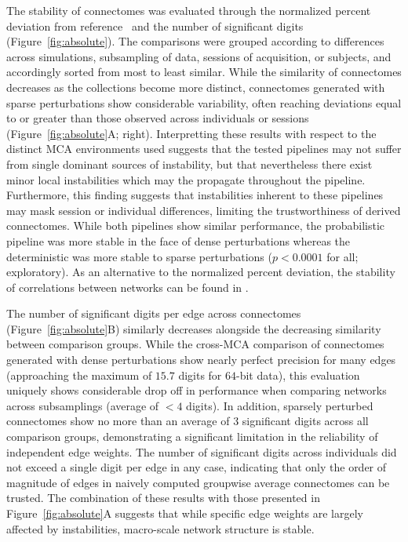 \documentclass[fleqn,10pt]{SelfArx} %
\newcommand{\new}[1]{{\color{blue} #1}}
\begin{document}
The stability of connectomes was evaluated through the \new{normalized percent} deviation from reference~\cite{Kiar2020-lb} and the number
of significant digits
(Figure~\ref{fig:absolute}). The comparisons were grouped according to differences across simulations, subsampling
of data, sessions of acquisition, or subjects, \new{and accordingly sorted from most to least similar}. While the
similarity of connectomes decreases as the collections become
more distinct, connectomes generated with \new{sparse} perturbations show considerable variability, often reaching deviations
equal to or greater than those observed across individuals or sessions (Figure~\ref{fig:absolute}A; right).
\new{Interpretting these results with respect to the distinct MCA environments used suggests that the tested pipelines
may not suffer from single dominant sources of instability, but that nevertheless there exist minor local instabilities
which may the propagate throughout the pipeline. Furthermore,} this
finding suggests that instabilities inherent to these pipelines may mask session or individual differences, limiting
the trustworthiness of derived connectomes. While both pipelines show similar performance, the probabilistic pipeline
was more stable in the face of \new{dense} perturbations whereas the deterministic was more stable to \new{sparse} perturbations
($p < 0.0001$ for all; exploratory). \new{As an alternative to the normalized percent deviation, the stability of}
correlations \new{between} networks can be found in .

The number of significant digits per edge across connectomes (Figure~\ref{fig:absolute}B) similarly decreases
\new{alongside the decreasing similarity between comparison groups}. While the cross-MCA comparison of connectomes
generated with \new{dense} perturbations show nearly perfect
precision for many edges (approaching the maximum of $15.7$ digits for $64$-bit data), this evaluation uniquely shows
considerable drop off in performance \new{when comparing networks across} subsamplings (average of $< 4$ digits). In addition, \new{sparsely
perturbed connectomes} show no more than an average of $3$ significant digits across all \new{comparison} groups, demonstrating a significant
limitation in the reliability \new{of} independent edge weights. \new{The number of significant digits} across individuals did not exceed a single digit
per edge in any case, indicating that only the order \new{of} magnitude of edges in naively computed groupwise average connectomes can
be trusted. The combination of these results with those presented in Figure~\ref{fig:absolute}A suggests that while
specific edge weights are largely affected by instabilities, macro-scale network \new{structure} is stable.
\end{document}

